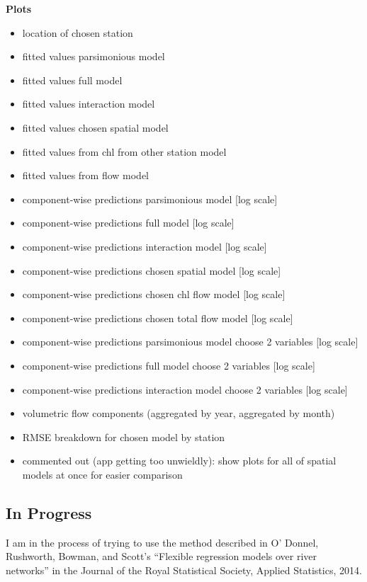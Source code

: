 \documentclass[12pt]{amsart}
\begin{document}
\textbf{Plots}
\begin{itemize}
\item location of chosen station
\item fitted values parsimonious model
\item fitted values full model
\item fitted values interaction model
\item fitted values chosen spatial model
\item fitted values from chl from other station model
\item fitted values from flow model
\item component-wise predictions parsimonious model  [log scale]
\item component-wise predictions full model  [log scale]
\item component-wise predictions interaction model  [log scale]
\item component-wise predictions chosen spatial model  [log scale]
\item component-wise predictions chosen chl flow model  [log scale]
\item component-wise predictions chosen total flow model  [log scale]
\item component-wise predictions parsimonious model choose 2 variables  [log scale]
\item component-wise predictions full model choose 2 variables  [log scale]
\item component-wise predictions interaction model choose 2 variables  [log scale]
\item volumetric flow components (aggregated by year, aggregated by month)
\item RMSE breakdown for chosen model by station
\item commented out (app getting too unwieldly): show plots for all of spatial models at once for easier comparison
\end{itemize}




\subsection{In Progress}

I am in the process of trying to use the method described in  O' Donnel, Rushworth, Bowman, and Scott's ``Flexible regression models over river networks'' in the Journal of the Royal Statistical Society, Applied Statistics, 2014.
\end{document}
